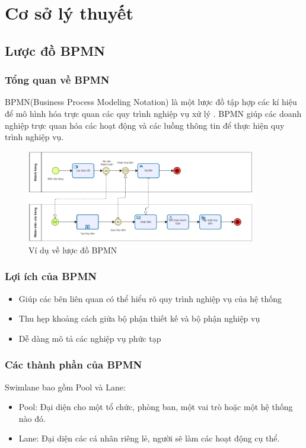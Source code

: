 \section{Cơ sở lý thuyết}
\subsection{Lược đồ BPMN}
\subsubsection{Tổng quan về BPMN}

\hspace*{0.5cm}BPMN(Business Process Modeling Notation) là một lược đồ tập hợp các kí hiệu để mô hình hóa trực quan các quy trình nghiệp vụ xử lý . BPMN giúp các doanh nghiệp trực quan hóa các hoạt động và các luồng thông tin để thực hiện quy trình nghiệp vụ.
\begin{figure}[!htp]
	\centering
	\includegraphics[width=10cm]{img/theory/BPMN/BPMN_sample.png}
	\newline
	\caption{Ví dụ về lược đồ BPMN}
\end{figure}



\subsubsection{Lợi ích của BPMN}
\begin{itemize}
	\item Giúp các bên liên quan có thể hiểu rõ quy trình nghiệp vụ của hệ thống
	\item Thu hẹp khoảng cách giửa bộ phận thiết kế và bộ phận nghiệp vụ
	\item Dễ dàng mô tả các nghiệp vụ phức tạp
\end{itemize}

\subsubsection{Các thành phần của BPMN}
Swimlane bao gồm Pool và Lane:
\begin{itemize}
	\item Pool: Đại diện cho một tổ chức, phòng ban, một vai trò hoặc một hệ thống nào đó.
	\item Lane: Đại diện các cá nhân riêng lẻ, người sẽ làm các hoạt động cụ thể.
\end{itemize}

